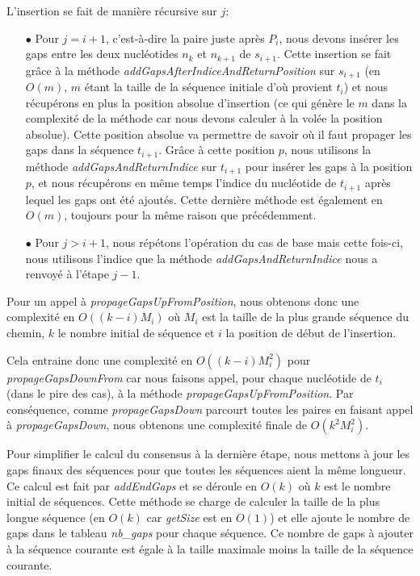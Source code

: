 L'insertion se fait de manière récursive sur $j$:
\begin{itemize}
	\item[$\bullet$] Pour $j = i + 1$, c'est-à-dire la paire juste après $P_{i}$, nous
		devons insérer les gaps entre les deux nucléotides $n_{k}$ et $n_{k +
		1}$ de $s_{i + 1}$. Cette insertion se fait grâce à la méthode
		\emph{addGapsAfterIndiceAndReturnPosition} sur $s_{i + 1}$ (en $O(m)$,
		$m$ étant la taille de la séquence initiale d'où provient $t_{i}$) et
		nous récupérons en plus la position absolue d'insertion (ce qui génère
		le $m$ dans la complexité de la méthode car nous devons calculer à la
		volée la position absolue). Cette position absolue va permettre de
		savoir où il faut propager les gaps dans la séquence $t_{i + 1}$. Grâce
		à cette position $p$, nous utilisons la méthode
		\emph{addGapsAndReturnIndice} sur $t_{i + 1}$ pour insérer les gaps à la
		position $p$, et nous récupérons en même temps l'indice du nucléotide de
		$t_{i + 1}$ après lequel les gaps ont été ajoutés. Cette dernière
		méthode est également en $O(m)$,
		toujours pour la même raison que précédemment.
	\item[$\bullet$] Pour $j > i + 1$, nous répétons l'opération du cas de base mais cette
		fois-ci, nous utilisons l'indice que la méthode
		\emph{addGapsAndReturnIndice} nous a renvoyé à l'étape $j - 1$.
\end{itemize}

Pour un appel à \emph{propageGapsUpFromPosition}, nous obtenons donc une
complexité en $O( (k - i) M_{i})$ où $M_{i}$ est la taille de la plus grande
séquence du chemin, $k$ le nombre initial de séquence et $i$ la position de
début de l'insertion.

Cela entraine donc une complexité en $O( (k - i) M_{i}^{2})$ pour
\emph{propageGapsDownFrom} car nous faisons appel, pour chaque nucléotide de
$t_{i}$ (dans le pire des cas), à la méthode \-\emph{propageGapsUpFromPosition}.
Par conséquence, comme \emph{propageGapsDown} parcourt toutes les paires en
faisant appel à \emph{propageGapsDown}, nous obtenons une complexité finale de
$O(k^{2} M_{i}^{2})$.

Pour simplifier le calcul du consensus à la dernière étape, nous mettons à jour
les gaps finaux des séquences pour que toutes les séquences aient la même
longueur. Ce calcul est fait par \emph{addEndGaps} et se déroule en $O(k)$ où
$k$ est le nombre initial de séquences. Cette méthode se charge de calculer la
taille de la plus longue séquence (en $O(k)$ car \emph{getSize} est en $O(1)$)
et elle ajoute le nombre de gaps dans le tableau \emph{nb\_gaps} pour chaque
séquence. Ce nombre de gaps à ajouter à la séquence courante est égale à la
taille maximale moins la taille de la séquence courante.

